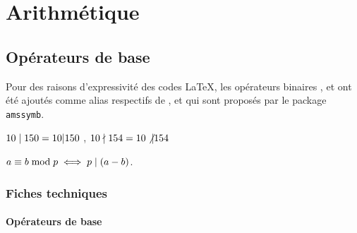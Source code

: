 \documentclass[12pt,a4paper]{article}
\begin{document}
\section{Arithmétique}

\subsection{Opérateurs de base}

Pour des raisons d'expressivité des codes \LaTeX{}, les opérateurs binaires ,  et  ont été ajoutés comme alias respectifs de ,  et  qui sont proposés par le package \verb+amssymb+.

\begin{latexex}
$10 \mid 150 = 10 | 150$ ,
$10 \nmid 154 = 10 \not| 154$

$a \equiv b \bmod p
 \iff
 p \mid (a - b)$.
\end{latexex}




\subsubsection{Fiches techniques}

\paragraph{Opérateurs de base}



\extraspace

\end{document}
